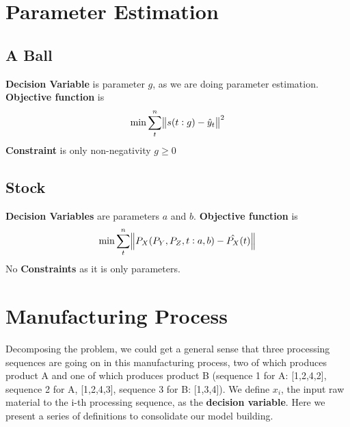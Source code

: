 \section{Parameter Estimation}

\subsection{A Ball}\label{prob3-1}
\textbf{Decision Variable} is parameter $g$, as we are doing parameter estimation. \textbf{Objective function} is 
$$
\min \sum_t^n \norm{s(t:g) - \hat{y}_t}^2
$$
\textbf{Constraint} is only non-negativity $g \geq 0$ 

\subsection{Stock} \label{prob3-2}

\textbf{Decision Variables} are parameters $a$ and $b$. \textbf{Objective function} is 
$$
\min \sum_t^n \norm{P_X(P_Y,P_Z,t:a,b) - \hat{P_X}(t)}
$$
No \textbf{Constraints} as it is only parameters.

\section{Manufacturing Process}\label{prob4}

Decomposing the problem, we could get a general sense that three processing sequences are going on in this manufacturing process, two of which produces product A and one of which produces product B (sequence 1 for A: [1,2,4,2], sequence 2 for A, [1,2,4,3], sequence 3 for B: [1,3,4]). We define $x_i$, the input raw material to the i-th processing sequence, as the \textbf{decision variable}. Here we present a series of definitions to consolidate our model building.

